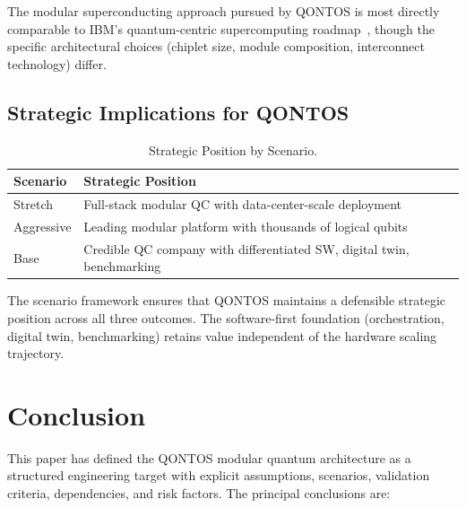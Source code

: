 \documentclass[conference]{IEEEtran}
\begin{document}
The modular superconducting approach pursued by QONTOS is most directly comparable to IBM's quantum-centric supercomputing roadmap~\cite{ibm2024, ibm2024b}, though the specific architectural choices (chiplet size, module composition, interconnect technology) differ.

\subsection{Strategic Implications for QONTOS}

\begin{table}[htbp]
\centering
\caption{Strategic Position by Scenario.}
\label{tab:strategic}
\begin{tabular}{lp{5cm}}
\toprule
\textbf{Scenario} & \textbf{Strategic Position} \\
\midrule
Stretch & Full-stack modular QC with data-center-scale deployment \\
Aggressive & Leading modular platform with thousands of logical qubits \\
Base & Credible QC company with differentiated SW, digital twin, benchmarking \\
\bottomrule
\end{tabular}
\end{table}

The scenario framework ensures that QONTOS maintains a defensible strategic position across all three outcomes. The software-first foundation (orchestration, digital twin, benchmarking) retains value independent of the hardware scaling trajectory.

\section{Conclusion}

This paper has defined the QONTOS modular quantum architecture as a structured engineering target with explicit assumptions, scenarios, validation criteria, dependencies, and risk factors. The principal conclusions are:
\end{document}
